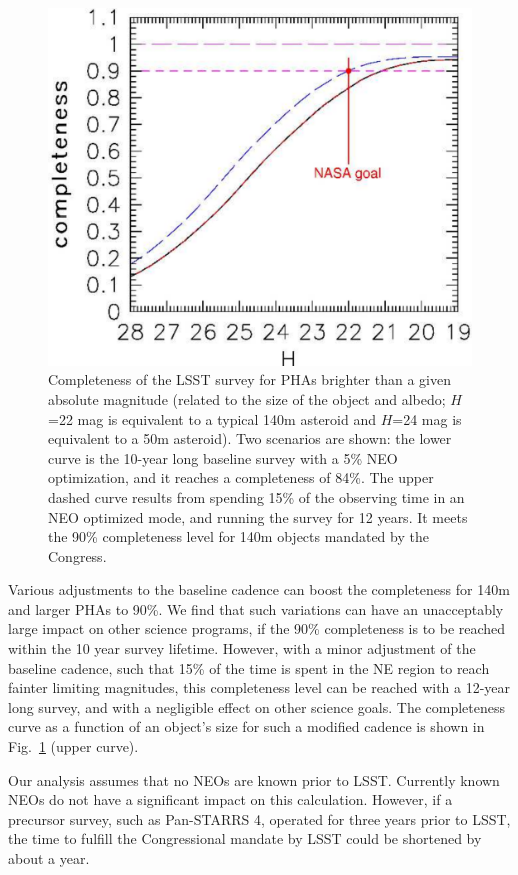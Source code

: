 \documentclass{emulateapj}
\begin{document}
\begin{figure}
\includegraphics[width=1.0\hsize,clip]{Cneo.pdf}
\caption{Completeness of the LSST survey for PHAs brighter than a given absolute
magnitude (related to the size of the object and albedo; 
$H$=22 mag is equivalent to a typical 140m asteroid and $H$=24 mag is
equivalent to a 50m asteroid). Two scenarios are shown: the lower curve is the 
10-year long baseline survey with a 5\% NEO optimization, and it reaches a 
completeness of 84\%. The upper dashed curve results from spending 15\% of the 
observing time in an NEO optimized mode, and running the survey for 12 years.  
It meets the 90\% completeness level for 140m objects mandated by the Congress.} 
\label{Fig:Cneo}
\end{figure}

Various adjustments to the baseline cadence can boost the completeness for
140m and larger PHAs to 90\%. We find that such variations can have an unacceptably 
large impact on other science programs, if the 90\% completeness is to be reached 
within the 10 year survey lifetime. However, with a minor adjustment of the 
baseline cadence, such that 15\% of the time is spent in the NE region to reach
fainter limiting magnitudes, this completeness level can be reached with a 12-year 
long survey, and with a negligible effect on other science goals. The completeness 
curve as a function of an object's size for such a modified cadence is shown in 
Fig.~\ref{Fig:Cneo} (upper curve).

Our analysis assumes that no NEOs are known prior to LSST. Currently known
NEOs do not have a significant impact on this calculation. However, if a precursor 
survey, such as Pan-STARRS 4, operated for three years prior to LSST, the time to
fulfill the Congressional mandate by LSST could be shortened by about a year.
\end{document}
